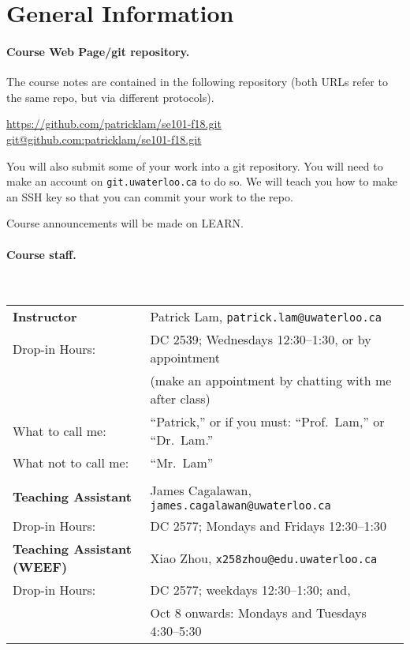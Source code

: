 \documentclass[11pt,onecolumn]{article}
\begin{document}
\section{General Information}

\paragraph{Course Web Page/git repository.} 

The course notes are contained in the following repository (both URLs
refer to the same repo, but via different protocols). 

\begin{center}
\url{https://github.com/patricklam/se101-f18.git}\\
\url{git@github.com:patricklam/se101-f18.git}
\end{center}

\noindent You will also submit some of your work into a git repository. You will
need to make an account on {\tt git.uwaterloo.ca} to do so. We will teach
you how to make an SSH key so that you can commit your work to the
repo.

\vspace*{1em} \noindent
Course announcements will be made on LEARN.


\newpage
\paragraph{Course staff.}~\\[1em]
\begin{tabular}{ll}
{\bf Instructor} & Patrick Lam, {\tt patrick.lam@uwaterloo.ca}\\
Drop-in Hours:& DC 2539; Wednesdays 12:30--1:30, or by appointment \\
& (make an appointment by chatting with me after class) \\

What to call me:& ``Patrick,'' or if you must: ``Prof.~Lam,'' or ``Dr.~Lam.''\\
What not to call me:& ``Mr.~Lam'' \\ \\

{\bf Teaching Assistant} &
James Cagalawan, {\tt james.cagalawan@uwaterloo.ca}\\
Drop-in Hours: & DC 2577; Mondays and Fridays 12:30--1:30 \\
{\bf Teaching Assistant (WEEF)} &
Xiao Zhou, {\tt x258zhou@edu.uwaterloo.ca}\\
Drop-in Hours: & DC 2577; weekdays 12:30--1:30; and, \\
& Oct 8 onwards: Mondays and Tuesdays 4:30--5:30
\end{tabular}
\end{document}
